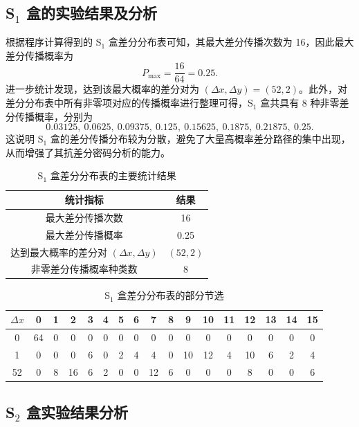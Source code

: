 \subsection{S$_1$ 盒的实验结果及分析}
根据程序计算得到的 S$_1$ 盒差分分布表可知，其最大差分传播次数为 16，因此最大差分传播概率为
\[
P_{\max}=\frac{16}{64}=0.25.
\]
进一步统计发现，达到该最大概率的差分对为 $(\Delta x,\Delta y)=(52,2)$。此外，对差分分布表中所有非零项对应的传播概率进行整理可得，S$_1$ 盒共具有 8 种非零差分传播概率，分别为
\[
0.03125,\ 0.0625,\ 0.09375,\ 0.125,\ 0.15625,\ 0.1875,\ 0.21875,\ 0.25.
\]
这说明 S$_1$ 盒的差分传播分布较为分散，避免了大量高概率差分路径的集中出现，从而增强了其抗差分密码分析的能力。

\begin{table}[H]
    \centering
    \caption{S$_1$ 盒差分分布表的主要统计结果}
    \label{tab:s1-summary}
    \begin{tabular}{cc}
        \hline
        统计指标 & 结果 \\
        \hline
        最大差分传播次数 & 16 \\
        最大差分传播概率 & 0.25 \\
        达到最大概率的差分对 $(\Delta x,\Delta y)$ & $(52,2)$ \\
        非零差分传播概率种类数 & 8 \\
        \hline
    \end{tabular}
\end{table}

\begin{table}[H]
    \centering
    \caption{S$_1$ 盒差分分布表的部分节选}
    \label{tab:s1-ddt-sample}
    \scriptsize
    \setlength{\tabcolsep}{4pt}
    \begin{tabular}{c|cccccccccccccccc}
        \hline
        $\Delta x$ & 0 & 1 & 2 & 3 & 4 & 5 & 6 & 7 & 8 & 9 & 10 & 11 & 12 & 13 & 14 & 15 \\
        \hline
        0  & 64 & 0 & 0 & 0 & 0 & 0 & 0 & 0 & 0 & 0 & 0 & 0 & 0 & 0 & 0 & 0 \\
        1  & 0 & 0 & 0 & 6 & 0 & 2 & 4 & 4 & 0 & 10 & 12 & 4 & 10 & 6 & 2 & 4 \\
        52 & 0 & 8 & 16 & 6 & 2 & 0 & 0 & 12 & 6 & 0 & 0 & 0 & 8 & 0 & 0 & 6 \\
        \hline
    \end{tabular}
\end{table}
\subsection{S$_2$ 盒实验结果分析}

